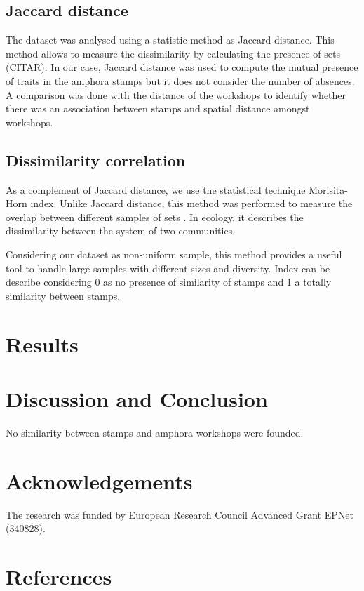 \documentclass[review]{elsarticle}
\begin{document}


\subsection{Jaccard distance}

The dataset was analysed using a statistic method as Jaccard distance. This method allows to measure the dissimilarity by calculating the presence of sets (CITAR). In our case, Jaccard distance was used to compute the mutual presence of traits in the amphora stamps but it does not consider the number of absences. A comparison was done with the distance of the workshops to identify whether there was an association between stamps and spatial distance amongst workshops. 


\subsection{Dissimilarity correlation}

As a complement of Jaccard distance, we use the statistical technique Morisita-Horn index. Unlike Jaccard distance, this method was performed to measure the overlap between different samples of sets \citep{horn_measurement_1966}. In ecology, it describes the dissimilarity between the system of two communities. 

Considering our dataset as non-uniform sample, this method provides a useful tool to handle large samples with different sizes and diversity. Index can be describe considering 0 as no presence of similarity of stamps and 1 a totally similarity between stamps. 



\section{Results}


\section{Discussion and Conclusion}

No similarity between stamps and amphora workshops were founded. 

\section{Acknowledgements}

The research was funded by European Research Council Advanced Grant
EPNet (340828). 


\section{References}


\end{document}
